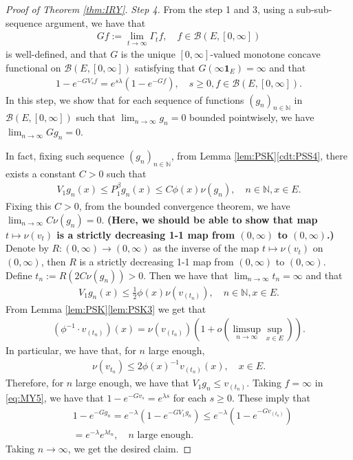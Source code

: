 \documentclass[12pt,a4paper]{amsart}
\numberwithin{equation}{section}
\theoremstyle{plain}
\theoremstyle{definition}
\begin{document}
\begin{proof}[Proof of Theorem \ref{thm:IRY}]
\emph{Step 4.}
From the step 1 and 3, using a sub-sub-sequence argument, we have that 
\begin{align}
	Gf
  := \lim_{t\to \infty} \Gamma_tf, \quad f\in \mathcal B(E,[0,\infty])
\end{align}
is well-defined, and that $G$ is the unique $[0,\infty]$-valued monotone concave functional on $\mathcal B(E,[0,\infty])$ satisfying that $G(\infty \mathbf 1_E) = \infty$ and that
\begin{align}
  \label{eq:MY5}
  1 - e^{- G V_sf} = e^{s\lambda} (1- e^{- G f}),
  \quad s \geq 0, f \in \mathcal B(E, [0,\infty]).
\end{align}
In this step, we show that for each sequence of functions $(g_{n})_{n\in \mathbb N}$ in $\mathcal B(E, [0,\infty])$ such that $\lim_{n \to \infty} g_n = 0$ bounded pointwisely, we have $\lim_{n \to \infty} G g_n = 0$.


In fact, fixing such sequence $(g_{n})_{n\in \mathbb N}$, from Lemma \ref{lem:PSK}\ref{cdt:PSS4}, there exists a constant $C > 0$ such that 
\begin{align}
	V_1 g_n(x) \leq P^\beta_1 g_n(x) \leq C \phi(x) \nu(g_n),
  \quad n \in \mathbb N, x\in E.
\end{align}
Fixing this $C>0$, from the bounded convergence theorem, we have $\lim_{n\to \infty}C \nu(g_n) =0$.
{\bf (Here, we should be able to show that map $t \mapsto \nu(v_t)$ is a strictly decreasing 1-1 map from $(0,\infty)$ to $(0,\infty)$.)}
Denote by $R:(0,\infty) \to (0,\infty)$ as the inverse of the map $t \mapsto \nu(v_t)$ on $(0,\infty)$, then $R$ is a strictly decreasing 1-1 map from $(0,\infty)$ to $(0,\infty)$. 
Define $t_n := R(2C\nu(g_n))> 0$.
Then we have that $\lim_{n\to \infty} t_n = \infty$ and that 
\begin{align}
	V_1 g_n(x) \leq \frac{1}{2} \phi(x) \nu(v_{(t_n)}), 
\quad n \in \mathbb N, x\in E.
\end{align}
From Lemma \ref{lem:PSK}\eqref{lem:PSK3} we get that
\begin{align}
 (\phi^{-1} \cdot v_{(t_n)})(x) 
  = \nu(v_{(t_n)}) ( 1+ o(\limsup_{n\to \infty} \sup_{x\in E}) ).
\end{align}
In particular, we have that, for $n$ large enough,
\begin{align}
	\nu(v_{t_n}) \leq 2 \phi(x)^{-1} v_{(t_n)}(x), \quad x\in E.
\end{align}
Therefore, for $n$ large enough, we have that $V_1g_n \leq v_{(t_n)}$.
Taking $f = \infty$ in \eqref{eq:MY5}, we have that $1 - e^{- Gv_s} = e^{\lambda s}$ for each $s\geq 0$.
These imply that
\begin{align}
	& 1 - e^{- Gg_n}
  = e^{- \lambda} (1- e^{- GV_1g_n})
  \leq e^{- \lambda} (1- e^{- G v_{(t_n)}}) \\
  & = e^{- \lambda} e^{\lambda t_n},
  \quad \text{$n$ large enough.}
\end{align} 
Taking $n\to \infty$, we get the desired claim.


\end{proof}
\end{document}

